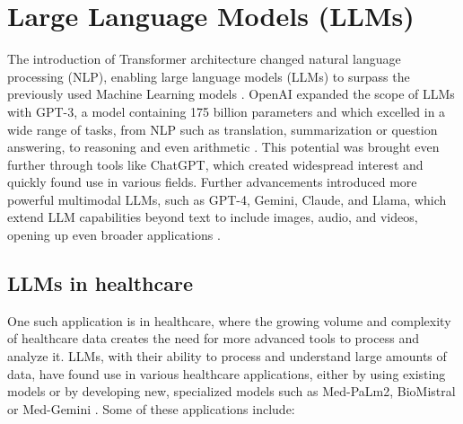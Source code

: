 \section{Large Language Models (LLMs)}

The introduction of Transformer architecture changed natural language processing (NLP), enabling large language models (LLMs) to surpass the previously used Machine Learning models \parencite{llm}. OpenAI expanded the scope of LLMs with GPT-3, a model containing 175 billion parameters and which excelled in a wide range of tasks, from NLP such as translation, summarization or question answering, to reasoning and even arithmetic \parencite{gpt3}. This potential was brought even further through tools like ChatGPT, which created widespread interest and quickly found use in various fields. Further advancements introduced more powerful multimodal LLMs, such as GPT-4, Gemini, Claude, and Llama, which extend LLM capabilities beyond text to include images, audio, and videos, opening up even broader applications \parencite{gpt4,gemini2,llama3,claude}.

\subsection{LLMs in healthcare}

One such application is in healthcare, where the growing volume and complexity of healthcare data creates the need for more advanced tools to process and analyze it. LLMs, with their ability to process and understand large amounts of data, have found use in various healthcare applications, either by using existing models or by developing new, specialized models such as Med-PaLm2, BioMistral or Med-Gemini \parencite{biomistral,medgemini,medpalm2}. Some of these applications include:

